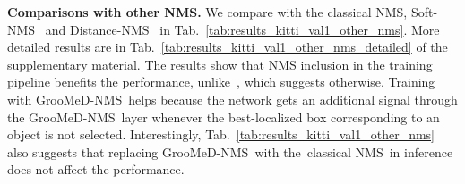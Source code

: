 \documentclass[final]{cvpr}
\newcommand{\myReferTable}[1]{Tab.~\ref{#1}}
\newcommand{\methodName}{GrooMeD-NMS}
\newcommand{\classicalNms}{classical NMS}
\newcommand{\softNmsCaps}{Soft-NMS}
\newcommand{\distanceNmsCaps}{Distance-NMS}
\begin{document}
\noindent\textbf{Comparisons with other NMS.}
            We compare with the \classicalNms, \softNmsCaps~\cite{bodla2017soft} and \distanceNmsCaps~\cite{shi2020distance} in \myReferTable{tab:results_kitti_val1_other_nms}.
            More detailed results are in \myReferTable{tab:results_kitti_val1_other_nms_detailed} of the supplementary material.
            The results show that NMS inclusion in the training pipeline benefits the performance, unlike~\cite{bodla2017soft}, which suggests otherwise. 
            Training with \methodName~helps because the network gets an additional signal through the \methodName~layer whenever the best-localized box corresponding to an object is not selected. 
            Interestingly, \myReferTable{tab:results_kitti_val1_other_nms} also suggests that replacing \methodName~with the~\classicalNms~in inference does not affect the performance.
\end{document}
